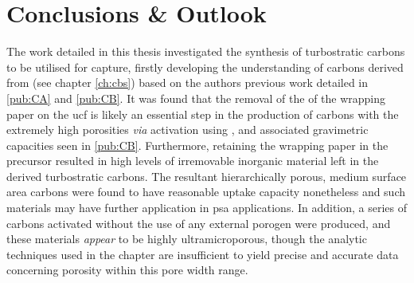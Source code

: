 \chapter{Conclusions \& Outlook}
\label{ch:conclusion}
The work detailed in this thesis investigated the synthesis of \glspl{turbostratic carbon} to be utilised for  capture, firstly developing the understanding of carbons derived from  (see chapter \ref{ch:cbs}) based on the authors previous work detailed in \ref{pub:CA} and \ref{pub:CB}. It was found that the removal of the of the wrapping paper on the \acrfull{ucf} is likely an essential step in the production of carbons with the extremely high porosities \textit{via} activation using , and associated gravimetric  capacities seen in \ref{pub:CB}. Furthermore, retaining the wrapping paper in the precursor resulted in high levels of irremovable inorganic material left in the derived \glspl{turbostratic carbon}. The resultant hierarchically porous, medium surface area carbons were found to have reasonable  uptake capacity nonetheless and such materials may have further application in \acrfull{psa} applications. In addition, a series of carbons activated without the use of any external \gls{porogen} were produced, and these materials \textit{appear} to be highly ultramicroporous, though the analytic techniques used in the chapter are insufficient to yield precise and accurate data concerning porosity within this pore width range. 

